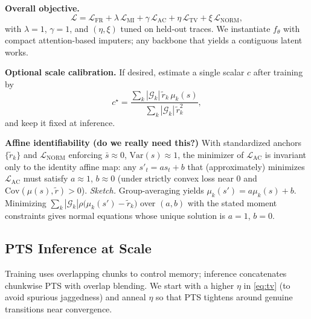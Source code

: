 \textbf{Overall objective.}
\begin{equation}
\label{eq:total}
\mathcal{L}=\mathcal{L}_{\mathrm{FR}}+\lambda\,\mathcal{L}_{\mathrm{MI}}+\gamma\,\mathcal{L}_{\mathrm{AC}}+\eta\,\mathcal{L}_{\mathrm{TV}}+\xi\,\mathcal{L}_{\mathrm{NORM}},
\end{equation}
with \(\lambda{=}1\), \(\gamma{=}1\), and \((\eta,\xi)\) tuned on held‑out traces. We instantiate \(f_\theta\) with compact attention-based imputers; any backbone that yields a contiguous latent works.

\textbf{Optional scale calibration.}
If desired, estimate a single scalar \(c\) after training by
\[
c^\star=\frac{\sum_k |\mathcal{G}_k|\,\tilde{r}_k\,\mu_k(s)}{\sum_k |\mathcal{G}_k|\,\tilde{r}_k^2},
\]
and keep it fixed at inference.

\textbf{Affine identifiability (do we really need this?)}
With standardized anchors \(\{\tilde{r}_k\}\) and \(\mathcal{L}_{\mathrm{NORM}}\) enforcing \(\bar{s}\!\approx\!0\), \(\mathrm{Var}(s)\!\approx\!1\), the minimizer of \(\mathcal{L}_{\mathrm{AC}}\) is invariant only to the identity affine map: any \(s'_t=a s_t+b\) that (approximately) minimizes \(\mathcal{L}_{\mathrm{AC}}\) must satisfy \(a\!\approx\!1\), \(b\!\approx\!0\) (under strictly convex loss near 0 and \(\mathrm{Cov}(\mu(s),\tilde{r})>0\)). \emph{Sketch.} Group-averaging yields \(\mu_k(s')=a\mu_k(s)+b\). Minimizing \(\sum_k |\mathcal{G}_k|\rho\big(\mu_k(s')-\tilde{r}_k\big)\) over \((a,b)\) with the stated moment constraints gives normal equations whose unique solution is \(a{=}1\), \(b{=}0\). 


\subsection{PTS Inference at Scale}
Training uses overlapping chunks to control memory; inference concatenates chunkwise PTS with overlap blending. We start with a higher \(\eta\) in \eqref{eq:tv} (to avoid spurious jaggedness) and anneal \(\eta\) so that PTS tightens around genuine transitions near convergence.

